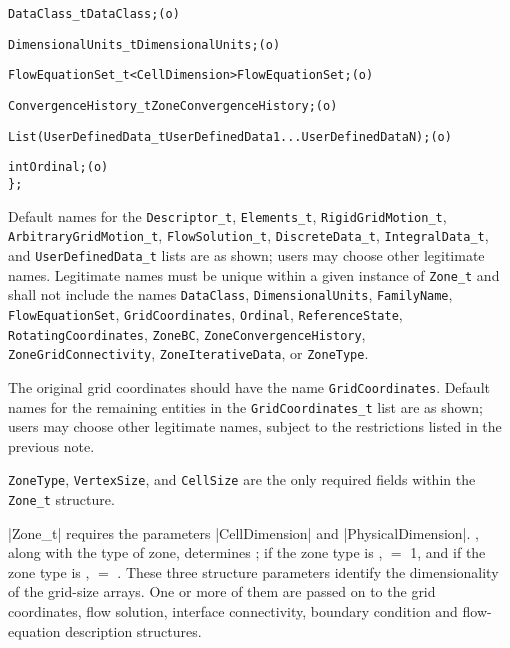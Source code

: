 \begin{alltt}
    DataClass_t DataClass ;                                                 (o)

    DimensionalUnits_t DimensionalUnits ;                                   (o)

    FlowEquationSet_t<CellDimension> FlowEquationSet ;                      (o)

    ConvergenceHistory_t ZoneConvergenceHistory ;                           (o)

    List( UserDefinedData\_t UserDefinedData1 ... UserDefinedDataN ) ;       (o)

    int Ordinal ;                                                           (o)
    \} ;
\end{alltt}

\begin{notes}
\item
 Default names for the \texttt{Descriptor\_t},
 \texttt{Elements\_t}, \texttt{RigidGridMotion\_t}, \texttt{ArbitraryGridMotion\_t},
 \texttt{FlowSolution\_t}, \texttt{DiscreteData\_t}, \texttt{IntegralData\_t}, and
 \texttt{UserDefinedData\_t}
 lists are as shown; users may choose other legitimate names.
 Legitimate names must be unique within a given instance of \texttt{Zone\_t}
 and shall not include the names
 \texttt{DataClass}, \texttt{DimensionalUnits}, \texttt{FamilyName},
 \texttt{FlowEquationSet}, \texttt{GridCoordinates}, \texttt{Ordinal},
 \texttt{Reference\-State}, \texttt{RotatingCoordinates}, \texttt{ZoneBC},
 \texttt{ZoneConvergenceHistory}, \texttt{ZoneGridConnectivity},
 \texttt{ZoneIterativeData}, or \texttt{ZoneType}.
\item
 The original grid coordinates should have the name \texttt{GridCoordinates}.
 Default names for the remaining entities in the \texttt{GridCoordinates\_t}
 list are as shown; users may choose other legitimate names, subject to
 the restrictions listed in the previous note.
\item
 \texttt{ZoneType}, \texttt{VertexSize}, and \texttt{CellSize}
 are the only required fields within the \texttt{Zone\_t} structure.
\end{notes}

|Zone_t| requires the parameters |CellDimension| and
|PhysicalDimension|.
, along with the type of zone, determines
; if the zone type is ,
 $=$ 1, and if the zone type is , 
 $=$ .
These three structure parameters identify the dimensionality of the
grid-size arrays.
One or more of them are passed on to the grid coordinates, flow
solution, interface connectivity, boundary condition and flow-equation
description structures.

